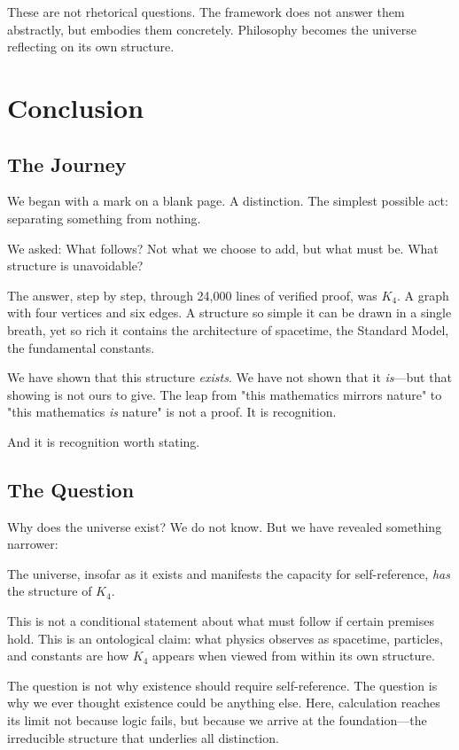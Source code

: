\documentclass[11pt,a4paper]{book}
\begin{document}
These are not rhetorical questions. The framework does not answer them abstractly, but embodies them concretely. Philosophy becomes the universe reflecting on its own structure.

\chapter{Conclusion}

\section{The Journey}

We began with a mark on a blank page. A distinction. The simplest possible act: separating something from nothing.

We asked: What follows? Not what we choose to add, but what must be. What structure is unavoidable?

The answer, step by step, through 24,000 lines of verified proof, was $K_4$. A graph with four vertices and six edges. A structure so simple it can be drawn in a single breath, yet so rich it contains the architecture of spacetime, the Standard Model, the fundamental constants.

We have shown that this structure \emph{exists}. We have not shown that it \emph{is}—but that showing is not ours to give. The leap from "this mathematics mirrors nature" to "this mathematics \emph{is} nature" is not a proof. It is recognition.

And it is recognition worth stating.

\section{The Question}

Why does the universe exist? We do not know. But we have revealed something narrower:

The universe, insofar as it exists and manifests the capacity for self-reference, \emph{has} the structure of $K_4$.

This is not a conditional statement about what must follow if certain premises hold. This is an ontological claim: what physics observes as spacetime, particles, and constants are how $K_4$ appears when viewed from within its own structure.

The question is not why existence should require self-reference. The question is why we ever thought existence could be anything else. Here, calculation reaches its limit not because logic fails, but because we arrive at the foundation—the irreducible structure that underlies all distinction.
\end{document}
